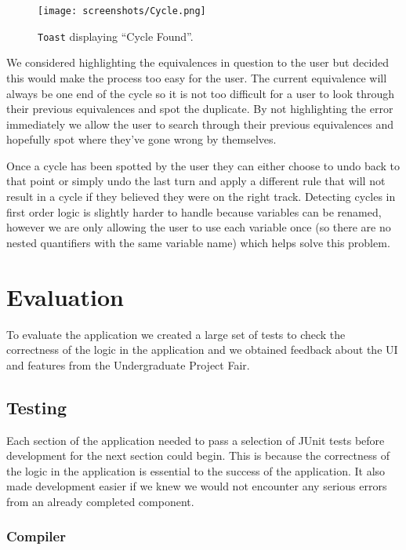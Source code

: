 \documentclass{report}
\begin{document}
\begin{figure}[ht!]
    \centering
    \texttt{[image: screenshots/Cycle.png]}
    \caption{{\tt Toast} displaying ``Cycle Found''.}
    \label{cycle}
\end{figure}

We considered highlighting the equivalences in question to the user but decided this would make the process too easy for the user. The current equivalence will always be one end of the cycle so it is not too difficult for a user to look through their previous equivalences and spot the duplicate. By not highlighting the error immediately we allow the user to search through their previous equivalences and hopefully spot where they've gone wrong by themselves.

Once a cycle has been spotted by the user they can either choose to undo back to that point or simply undo the last turn and apply a different rule that will not result in a cycle if they believed they were on the right track. Detecting cycles in first order logic is slightly harder to handle because variables can be renamed, however we are only allowing the user to use each variable once (so there are no nested quantifiers with the same variable name) which helps solve this problem.

\chapter{Evaluation}

To evaluate the application we created a large set of tests to check the correctness of the logic in the application and we obtained feedback about the UI and features from the Undergraduate Project Fair.

\section{Testing}

Each section of the application needed to pass a selection of JUnit tests before development for the next section could begin. This is because the correctness of the logic in the application is essential to the success of the application. It also made development easier if we knew we would not encounter any serious errors from an already completed component.

\subsection{Compiler}
\end{document}
